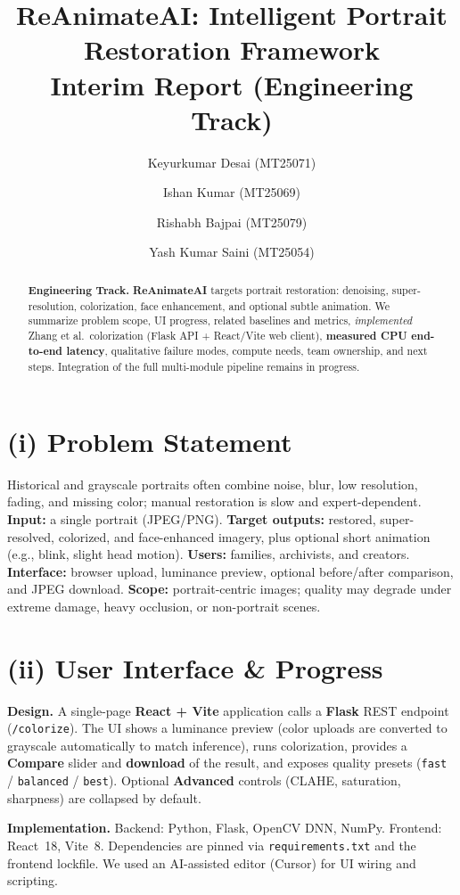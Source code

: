 \documentclass[10pt,letterpaper]{article}
\title{ReAnimateAI: Intelligent Portrait Restoration Framework\\[0.3em]
\large Interim Report (Engineering Track)}
\author{
Keyurkumar Desai (MT25071) \and
Ishan Kumar (MT25069) \and
Rishabh Bajpai (MT25079) \and
Yash Kumar Saini (MT25054)
}
\date{}
\newcommand{\etal}{et al.\ }
\begin{document}
\maketitle

\begin{abstract}
\noindent
\textbf{Engineering Track.} \textbf{ReAnimateAI} targets portrait restoration: denoising, super-resolution, colorization, face enhancement, and optional subtle animation. We summarize problem scope, UI progress, related baselines and metrics, \emph{implemented} Zhang \etal colorization (Flask API + React/Vite web client), \textbf{measured CPU end-to-end latency}, qualitative failure modes, compute needs, team ownership, and next steps. Integration of the full multi-module pipeline remains in progress.
\end{abstract}

\section{(i) Problem Statement}
Historical and grayscale portraits often combine noise, blur, low resolution, fading, and missing color; manual restoration is slow and expert-dependent. \textbf{Input:} a single portrait (JPEG/PNG). \textbf{Target outputs:} restored, super-resolved, colorized, and face-enhanced imagery, plus optional short animation (e.g., blink, slight head motion). \textbf{Users:} families, archivists, and creators. \textbf{Interface:} browser upload, luminance preview, optional before/after comparison, and JPEG download. \textbf{Scope:} portrait-centric images; quality may degrade under extreme damage, heavy occlusion, or non-portrait scenes.

\section{(ii) User Interface \& Progress}
\textbf{Design.} A single-page \textbf{React + Vite} application calls a \textbf{Flask} REST endpoint (\texttt{/colorize}). The UI shows a luminance preview (color uploads are converted to grayscale automatically to match inference), runs colorization, provides a \textbf{Compare} slider and \textbf{download} of the result, and exposes quality presets (\texttt{fast} / \texttt{balanced} / \texttt{best}). Optional \textbf{Advanced} controls (CLAHE, saturation, sharpness) are collapsed by default.

\textbf{Implementation.} Backend: Python, Flask, OpenCV DNN, NumPy. Frontend: React~18, Vite~8. Dependencies are pinned via \texttt{requirements.txt} and the frontend lockfile. We used an AI-assisted editor (Cursor) for UI wiring and scripting.
\end{document}
